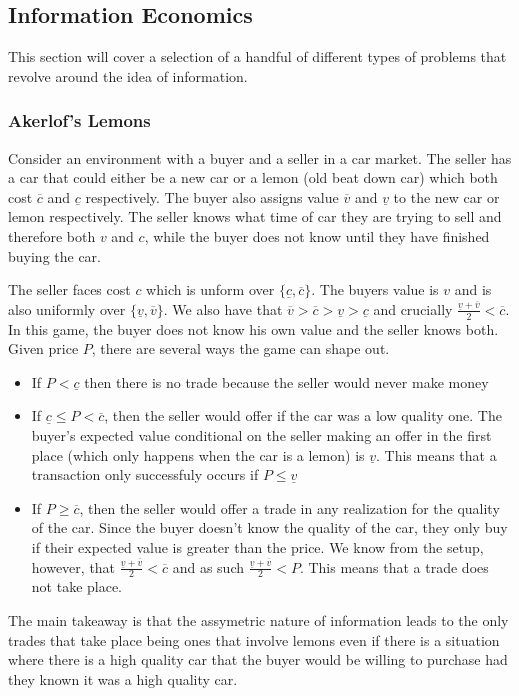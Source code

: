 \documentclass[11pt,english]{article}
\begin{document}
\subsection{Information Economics}
This section will cover a selection of a handful of different types of problems that revolve around the idea of information.

\subsubsection{Akerlof's Lemons}
Consider an environment with a buyer and a seller in a car market. The seller has a car that could either be a new car or a lemon (old beat down car) which both cost $\overline{c}$ and $\underline{c}$ respectively. The buyer also assigns value $\overline{v}$ and $\underline{v}$ to the new car or lemon respectively. The seller knows what time of car they are trying to sell and therefore both $v$ and $c$, while the buyer does not know until they have finished buying the car.

The seller faces cost $c$ which is unform over $\{\underline{c}, \overline{c}\}$. The buyers value is $v$ and is also uniformly over $\{\underline{v}, \overline{v}\}$. We also have that $\overline{v} > \overline{c} > \underline{v} > \underline{c}$ and crucially $\frac{\underline{v} + \overline{v}}{2} < \overline{c}$. In this game, the buyer does not know his own value and the seller knows both. Given price $P$, there are several ways the game can shape out.
\begin{itemize}
\item If $P < \underline{c}$ then there is no trade because the seller would never make money
\item If $\underline{c} \leq P < \overline{c}$, then the seller would offer if the car was a low quality one. The buyer's expected value conditional on the seller making an offer in the first place (which only happens when the car is a lemon) is $\underline{v}$. This means that a transaction only successfuly occurs if $P \leq \underline{v}$
\item If $P \geq \overline{c}$, then the seller would offer a trade in any realization for the quality of the car. Since the buyer doesn't know the quality of the car, they only buy if their expected value is greater than the price. We know from the setup, however, that $\frac{\underline{v} + \overline{v}}{2} < \overline{c}$ and as such $\frac{\underline{v} + \overline{v}}{2} < P$. This means that a trade does not take place.
\end{itemize}
The main takeaway is that the assymetric nature of information leads to the only trades that take place being ones that involve lemons even if there is a situation where there is a high quality car that the buyer would be willing to purchase had they known it was a high quality car.
\end{document}
